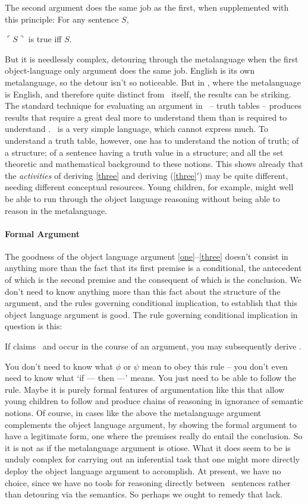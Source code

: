 The second argument does the same job as the first, when supplemented with this principle: For any sentence $S$, \begin{exe}
	 $\ulcorner S\urcorner$ is true iff $S$.
\end{exe} But it is needlessly complex, detouring through the metalanguage when the first object-language only argument does the same job. English is its own metalanguage, so the detour isn't so noticeable. But in \lone, where the metalanguage is English, and therefore quite distinct from \lone\ itself, the results can be striking. The standard technique for evaluating an argument in \lone\ – truth tables – produces results that require a great deal more to understand them than is required to understand \lone. \lone\ is a very simple language, which cannot express much. To understand a truth table, however, one has to understand the notion of truth; of a structure; of a sentence having a truth value in a structure; and all the set theoretic and mathematical background to these notions. This shows already that the \emph{activities} of deriving \eqref{three} and deriving (\ref{three}$'$) may be quite different, needing different conceptual resources. Young children, for example, might well be able to run through the object language reasoning without being able to reason in the metalanguage.

\paragraph{Formal Argument} The goodness of the object language argument \eqref{one}–\eqref{three} doesn't consist in anything more than the fact that its first premise is a conditional, the antecedent of which is the second premise and the consequent of which is the conclusion. We don't need to know anything more than this fact about the structure of the argument, and the rules governing conditional implication, to establish that this object language argument is good. The rule governing conditional implication in question is this: \begin{exe}
	 If claims \cquote{\phi}\ and  occur in the course of an argument, you may subsequently derive \cquote{\psi}.
\end{exe}
You don't need to know what $\phi$ or $\psi$ mean to obey this rule – you don't even need to know what `if — then —' means. You just need to be able to follow the rule. Maybe it is purely formal features of argumentation like this that allow young children to follow and produce chains of reasoning in ignorance of semantic notions. Of course, in cases like the above the metalanguage argument complements the object language argument, by showing the formal argument to have a legitimate form, one where the premises really do entail the conclusion. So it is not as if the metalanguage argument is otiose. What it does seem to be is unduly complex for carrying out an inferential task that one might more directly deploy the object language argument to accomplish. At present, we have no choice, since we have no tools for reasoning directly between \lone\ sentences rather than detouring via the semantics. So perhaps we ought to remedy that lack.

